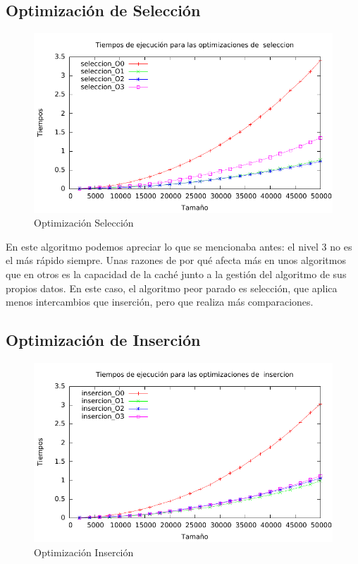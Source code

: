 \documentclass[a4paper, 11pt]{article}
\begin{document}
\subsection{Optimización de Selección}

\begin{figure}[H]\includegraphics[width=13cm]{img/seleccion_optim_g.pdf} \centering
	\caption{Optimización Selección}\end{figure}

En este algoritmo podemos apreciar lo que se mencionaba antes: el nivel 3 no es el más rápido siempre. Unas razones de por qué afecta más en unos algoritmos que en otros es la capacidad de la caché junto a la gestión del algoritmo de sus propios datos. En este caso, el algoritmo peor parado es selección, que aplica menos intercambios que inserción, pero que realiza más comparaciones.

\newpage
\subsection{Optimización de Inserción}

\begin{figure}[H]\includegraphics[width=13cm]{img/insercion_optim_g.pdf} \centering
	\caption{Optimización Inserción}\end{figure}
\end{document}
